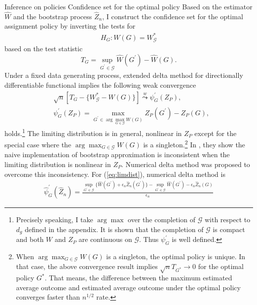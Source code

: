\documentclass[12pt,oneside,reqno,english]{amsart}
\makeatletter
\renewcommand\subsection{\@startsection{subsection}{2}%
  \z@{-.5\linespacing\@plus-.7\linespacing}{.5\linespacing}%
  {\normalfont\scshape}}
\renewcommand\subsubsection{\@startsection{subsubsection}{3}%
  \z@{.5\linespacing\@plus.7\linespacing}{-.5em}%
  {\normalfont\scshape}}
\theoremstyle{definition}
\makeatother
\begin{document}
\subsection{Inference on policies}\label{test}
\subsubsection{Confidence set for the optimal policy}\label{CS}
Based on the estimator $\hat{W}$ and the bootstrap process $\hat{Z}_{n}$,
I construct the confidence set for the optimal assignment policy by inverting the tests for
\begin{align*}
H_{G}: W(G)=W^{*}_{\mathcal{G}}
\end{align*}  
based on the test statistic
\[T_{G}=\sup_{G^{\prime}\in \mathcal{G}}\hat{W}(G^{\prime})-\hat{W}(G).\]
Under a fixed data generating process, extended delta method for directionally differentiable functional \citep{Shapiro:90, Dumbgen:93} 
implies the following weak convergence 
\begin{align}
&\sqrt{n}\left[T_{G}-\{W^{*}_{\mathcal{G}}-W(G)\}\right]
\overset{w}{\underset{}{\leadsto}}\psi^{\prime}_{G}(Z_{P}),\label{eq:limdist}\\
&\psi^{\prime}_{G}(Z_{P})=\max_{G^{\prime}\in \arg\max_{G\in \mathcal{G}}W(G)}Z_{P}(G^{\prime})-Z_{P}(G),\nonumber
\end{align}
holds.\footnote{Precisely speaking, I take $\arg\max$ over the completion of $\mathcal{G}$ with respect to $d_{g}$ defined in the appendix.
It is shown that the completion of $\mathcal{G}$ is compact and both $W$ and $Z_{P}$ are continuous on $\mathcal{G}$. Thus $\psi^{\prime}_{G}$ is well defined.} 
The limiting distribution is in general, nonlinear in  $Z_{P}$ except for the special case where the $\arg\max_{G\in \mathcal{G}}W(G)$ is a singleton.\footnote{
  When $\arg\max_{G\in \mathcal{G}}W(G)$ is a singleton, the optimal policy is unique. In that case, the above convergence result implies 
  $\sqrt{n}T_{G^{*}}\rightarrow 0$ for the optimal policy $G^{*}$. That means, the difference between the maximum estimated average outcome and 
  estimated average outcome under the optimal policy converges faster than $n^{1/2}$ rate.
}
In \cite{FS:16}, they show the naive implementation of bootstrap approximation is inconsistent when the limiting distribution is nonlinear in $Z_{P}$. 
Numerical delta method \citep{Dumbgen:93,HL:18} was proposed to overcome this inconsistency. For (\ref{eq:limdist}), numerical delta method is 
\begin{align*}
\hat{\psi}^{\prime}_{G}(\hat{Z}_{n})=\frac{\sup_{G^{\prime}\in \mathcal{G}}\{\hat{W}(G^{\prime})+\epsilon_{n}\hat{Z}_{n}(G^{\prime})\}-\sup_{G^{\prime}\in \mathcal{G}}\hat{W}(G^{\prime})
-\epsilon_{n}\hat{Z}_{n}(G)}{\epsilon_{n}}
\end{align*}
\end{document}
